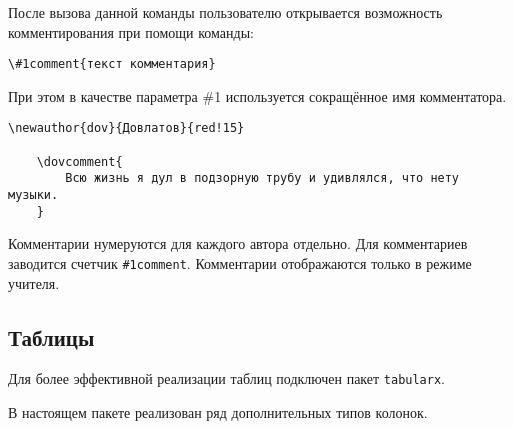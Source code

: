 После вызова данной команды пользователю открывается возможность комментирования при помощи команды:

\begin{lstlisting}[gobble = 3]
    \#1comment{текст комментария}
\end{lstlisting}

При этом в качестве параметра \#1 используется сокращённое имя комментатора.


\begin{lstlisting}[gobble = 3]
    \newauthor{dov}{Довлатов}{red!15}

    \dovcomment{
        Всю жизнь я дул в подзорную трубу и удивлялся, что нету музыки.
    }
\end{lstlisting}

\vspace{0.2cm}


    
Комментарии нумеруются для каждого автора отдельно. Для комментариев заводится счетчик
\texttt{\#1comment}. Комментарии отображаются только в режиме учителя.




\subsection{Таблицы}
\label{sec:tables}

Для более эффективной реализации таблиц подключен пакет \texttt{tabularx}.


В настоящем пакете реализован ряд дополнительных типов колонок.

\vspace{0.4cm}

